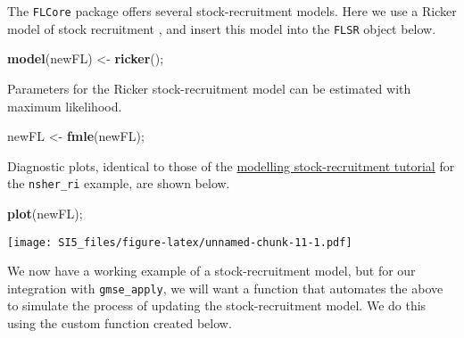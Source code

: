 \documentclass[]{article}
\newenvironment{Shaded}{\begin{snugshade}}{\end{snugshade}}
\newcommand{\KeywordTok}[1]{\textcolor[rgb]{0.13,0.29,0.53}{\textbf{{#1}}}}
\newcommand{\StringTok}[1]{\textcolor[rgb]{0.31,0.60,0.02}{{#1}}}
\newcommand{\NormalTok}[1]{{#1}}
\begin{document}
The \texttt{FLCore} package offers several stock-recruitment models.
Here we use a Ricker model of stock recruitment \citep{Ricker1954}, and
insert this model into the \texttt{FLSR} object below.

\begin{Shaded}
\begin{Highlighting}[]
\KeywordTok{model}\NormalTok{(newFL) <-}\StringTok{ }\KeywordTok{ricker}\NormalTok{();}
\end{Highlighting}
\end{Shaded}

Parameters for the Ricker stock-recruitment model can be estimated with
maximum likelihood.

\begin{Shaded}
\begin{Highlighting}[]
\NormalTok{newFL <-}\StringTok{ }\KeywordTok{fmle}\NormalTok{(newFL);}
\end{Highlighting}
\end{Shaded}

Diagnostic plots, identical to those of the
\href{http://www.flr-project.org/doc/Modelling_stock_recruitment_with_FLSR.html}{modelling
stock-recruitment tutorial} for the \texttt{nsher\_ri} example, are
shown below.

\begin{Shaded}
\begin{Highlighting}[]
\KeywordTok{plot}\NormalTok{(newFL);}
\end{Highlighting}
\end{Shaded}

\texttt{[image: SI5\_files/figure-latex/unnamed-chunk-11-1.pdf]}

We now have a working example of a stock-recruitment model, but for our
integration with \texttt{gmse\_apply}, we will want a function that
automates the above to simulate the process of updating the
stock-recruitment model. We do this using the custom function created
below.
\end{document}
